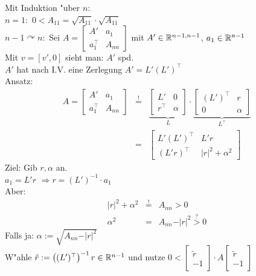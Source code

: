 \documentclass{scrartcl}
\begin{document}
\begin{Bew}
Mit Induktion "uber $n$: \\
$n=1:$  $0 < A_{11} = \sqrt{A_{11}} \cdot \sqrt{A_{11}}$ \\
$n-1 \curvearrowright n:$ Sei $A = \left[ \begin{matrix} A' & a_1 \\ a_1^\top & A_{nn} \end{matrix} \right]$ mit $A' \in \mathbb{R}^{n-1,n-1}$, $a_1 \in \mathbb{R}^{n-1}$ \\
Mit $v = [v', 0]$ sieht man: $A'$ spd. \\
$A'$ hat nach I.V. eine Zerlegung $A' = L'(L')^\top$ \\
Ansatz:
\begin{eqnarray*}
A = \left[ \begin{matrix} A' & a_1 \\ a_1^\top & A_{nn} \end{matrix} \right] & \stackrel{!}{=} & \underbrace{\left[ \begin{matrix} L' & 0 \\ r^\top & \alpha \end{matrix} \right]}_L \cdot \underbrace{\left[ \begin{matrix} (L')^\top & r \\ 0 & \alpha \end{matrix} \right]}_{L^\top} \\
& = & \left[ \begin{matrix} L'(L')^\top & L'r \\ (L'r)^\top & \vert r \vert^2 + \alpha^2 \end{matrix} \right]
\end{eqnarray*}
Ziel: Gib $r, \alpha$ an. \\
$a_1 = L'r$ $\Rightarrow r = (L')^{-1} \cdot a_1$ \\
Aber:
\begin{eqnarray*}
\vert r \vert ^2 + \alpha^2 & \stackrel{!}{=} & A_{nn} > 0 \\
\alpha^2 & = & A_{nn} - \vert r \vert ^2 \stackrel{?}{>} 0
\end{eqnarray*}
Falls ja: $\alpha := \sqrt{ A_{nn} - \vert r \vert ^2}$ \\
W"ahle $\tilde r := \left( (L')^\top \right)^{-1}   r \in \mathbb{R}^{n-1}$ und nutze $0 < \left[ \begin{matrix} \tilde r \\ -1 \end{matrix} \right] \cdot A \left[ \begin{matrix} \tilde r \\ -1 \end{matrix} \right]$
\end{Bew}
\end{document}
